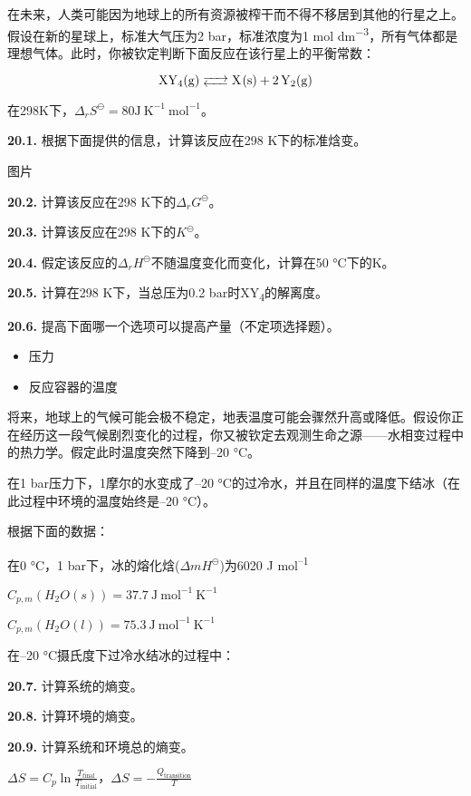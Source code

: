 在未来，人类可能因为地球上的所有资源被榨干而不得不移居到其他的行星之上。假设在新的星球上，标准大气压为2 bar，标准浓度为1 mol
dm\textsuperscript{−3}，所有气体都是理想气体。此时，你被钦定判断下面反应在该行星上的平衡常数：

$$\ce{XY4(g) <--> X(s) + 2Y2(g)}$$

在298K下，\(\Delta_r S^\ominus = 80 \mathrm {J\ K^{-1}\ mol^{-1}}\)。

\noindent\textbf{20.1.} 根据下面提供的信息，计算该反应在298 K下的标准焓变。

图片

\noindent\textbf{20.2.} 计算该反应在298 K下的$\Delta_r G^{\ominus}$。

\noindent\textbf{20.3.} 计算该反应在298 K下的$K^\ominus$。

\noindent\textbf{20.4.} 假定该反应的$\Delta_rH^{\ominus}$不随温度变化而变化，计算在50 °C下的K。

\noindent\textbf{20.5.} 计算在298 K下，当总压为0.2 bar时XY\textsubscript{4}的解离度。

\noindent\textbf{20.6. } 提高下面哪一个选项可以提高产量（不定项选择题）。

\renewcommand{\labelitemi}{$\square$}
\begin{itemize}
	\item 压力
	\item 反应容器的温度
\end{itemize}
\renewcommand{\labelitemi}{$\bullet$}

将来，地球上的气候可能会极不稳定，地表温度可能会骤然升高或降低。假设你正在经历这一段气候剧烈变化的过程，你又被钦定去观测生命之源------水相变过程中的热力学。假定此时温度突然下降到--20
°C。

在1 bar压力下，1摩尔的水变成了--20 °C的过冷水，并且在同样的温度下结冰（在此过程中环境的温度始终是--20 °C）。

根据下面的数据：

在0 °C，1 bar下，冰的熔化焓(\(\Delta m H^\ominus\))为6020 J mol\textsuperscript{--1}

\(C_{p,m}(H_2O(s)) = 37.7\ \mathrm{J\ mol^{-1}\ K^{-1}}\)

\(C_{p,m}(H_2O(l)) = 75.3\ \mathrm{J\ mol^{-1}\ K^{-1}}\)

在--20 °C摄氏度下过冷水结冰的过程中：

\noindent\textbf{20.7.} 计算系统的熵变。

\noindent\textbf{20.8.} 计算环境的熵变。

\noindent\textbf{20.9.} 计算系统和环境总的熵变。

\(\Delta S = C_p\ln \frac{T_{\mathrm{final}}}{T_{\mathrm{initial}}}\)，\(\Delta S = - \frac{Q_{\mathrm{transition}}}{T}\)

